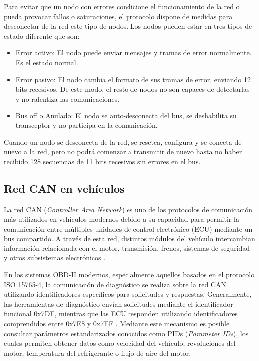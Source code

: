 Para evitar que un nodo con errores condicione el funcionamiento de la red o pueda provocar fallos o saturaciones, el protocolo dispone de medidas para desconectar de la red este tipo de nodos. Los nodos pueden estar en tres tipos de estado diferente que son:
\begin{itemize}
    \item Error activo: El nodo puede enviar mensajes y tramas de error normalmente. Es el estado normal.
    \item Error pasivo: El nodo cambia el formato de sus tramas de error, enviando 12 bits recesivos. De este modo, el resto de nodos no son capaces de detectarlas y no ralentiza las comunicaciones.
    \item Bus off o Anulado: El nodo se auto-desconecta del bus, se deshabilita su transceptor y no participa en la comunicación.
\end{itemize}

Cuando un nodo se desconecta de la red, se resetea, configura y se conecta de nuevo a la red, pero no podrá comenzar a transmitir de nuevo hasta no haber recibido 128 secuencias de 11 bits recesivos sin errores en el bus.
\subsection{Red CAN en vehículos}

La red CAN (\textit{Controller Area Network}) es uno de los protocolos de comunicación más utilizados en vehículos modernos debido a su capacidad para permitir la comunicación entre múltiples unidades de control electrónico (ECU) mediante un bus compartido. A través de esta red, distintos módulos del vehículo intercambian información relacionada con el motor, transmisión, frenos, sistemas de seguridad y otros subsistemas electrónicos \citep{Flexihub_OBD2, CISE_CAN}. 

En los sistemas OBD-II modernos, especialmente aquellos basados en el protocolo ISO 15765-4, la comunicación de diagnóstico se realiza sobre la red CAN utilizando identificadores específicos para solicitudes y respuestas. Generalmente, las herramientas de diagnóstico envían solicitudes mediante el identificador funcional 0x7DF, mientras que las ECU responden utilizando identificadores comprendidos entre 0x7E8 y 0x7EF \citep{Flexihub_OBD2}. Mediante este mecanismo es posible consultar parámetros estandarizados conocidos como PIDs (\textit{Parameter IDs}), los cuales permiten obtener datos como velocidad del vehículo, revoluciones del motor, temperatura del refrigerante o flujo de aire del motor.

